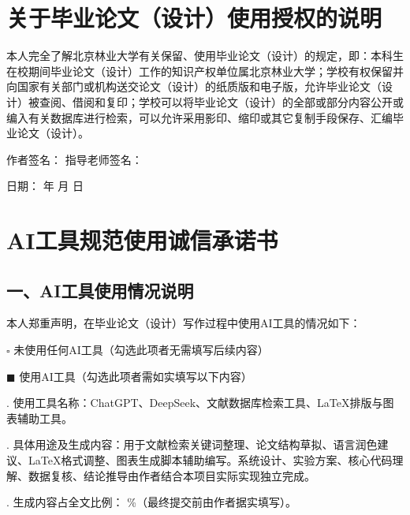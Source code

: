 \documentclass[UTF8,zihao=-4,scheme=chinese,fontset=none]{ctexart}
\begin{document}
\vspace{2.5cm}
\section*{关于毕业论文（设计）使用授权的说明}
本人完全了解北京林业大学有关保留、使用毕业论文（设计）的规定，即：本科生在校期间毕业论文（设计）工作的知识产权单位属北京林业大学；学校有权保留并向国家有关部门或机构送交论文（设计）的纸质版和电子版，允许毕业论文（设计）被查阅、借阅和复印；学校可以将毕业论文（设计）的全部或部分内容公开或编入有关数据库进行检索，可以允许采用影印、缩印或其它复制手段保存、汇编毕业论文（设计）。

\vspace{1.5cm}
\noindent 作者签名：\hspace{4cm} 指导老师签名：\hspace{2cm}

\vspace{0.8cm}
\noindent 日\quad 期：\hspace{1cm} 年 \hspace{0.5cm} 月 \hspace{0.5cm} 日

\clearpage
\thispagestyle{empty}
\section*{AI工具规范使用诚信承诺书}
\subsection*{一、AI工具使用情况说明}
本人郑重声明，在毕业论文（设计）写作过程中使用AI工具的情况如下：

\vspace{0.4cm}
\noindent $\square$ 未使用任何AI工具（勾选此项者无需填写后续内容）

\noindent $\blacksquare$ 使用AI工具（勾选此项者需如实填写以下内容）

\vspace{0.4cm}
. 使用工具名称：ChatGPT、DeepSeek、文献数据库检索工具、LaTeX排版与图表辅助工具。

. 具体用途及生成内容：用于文献检索关键词整理、论文结构草拟、语言润色建议、LaTeX格式调整、图表生成脚本辅助编写。系统设计、实验方案、核心代码理解、数据复核、结论推导由作者结合本项目实际实现独立完成。

. 生成内容占全文比例：\underline{\hspace{1.5cm}} \%（最终提交前由作者据实填写）。
\end{document}
